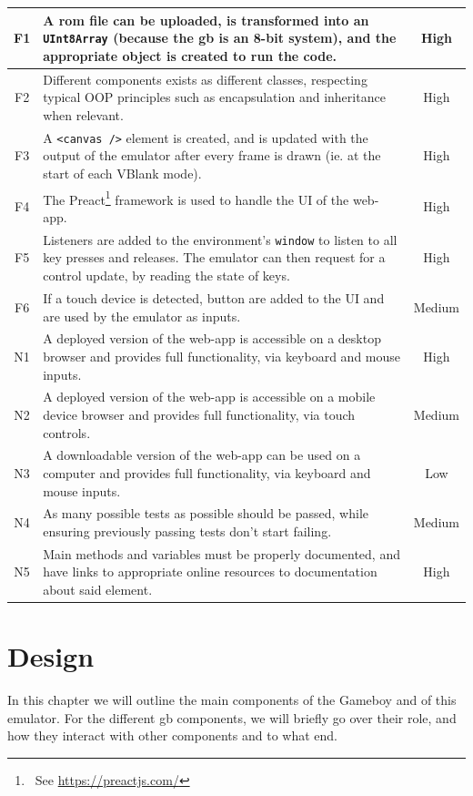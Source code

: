 \documentclass[11pt]{report}
\newcommand{\ftnt}[1]{\footnote{~See \url{#1}}}
\begin{document}
\begin{xltabular}{\textwidth}{|c|X|c|}
    F1 & A \gls{rom} file can be uploaded, is transformed into an \texttt{UInt8Array} (because the \gls{gb} is an 8-bit system), and the appropriate object is created to run the code. & High \\ \hline
    F2 & Different components exists as different classes, respecting typical OOP principles such as encapsulation and inheritance when relevant. & High \\ \hline
    F3 & A \texttt{<canvas />} element is created, and is updated with the output of the emulator after every frame is drawn (ie. at the start of each VBlank mode). & High \\ \hline
    F4 & The Preact\ftnt{https://preactjs.com/} framework is used to handle the UI of the web-app. & High \\ \hline
    F5 & Listeners are added to the environment's \texttt{window} to listen to all key presses and releases. The emulator can then request for a control update, by reading the state of keys. & High \\ \hline
    F6 & If a touch device is detected, button are added to the UI and are used by the emulator as inputs. & Medium \\ \hline

    N1 & A deployed version of the web-app is accessible on a desktop browser and provides full functionality, via keyboard and mouse inputs. & High \\ \hline
    N2 & A deployed version of the web-app is accessible on a mobile device browser and provides full functionality, via touch controls. & Medium \\ \hline
    N3 & A downloadable version of the web-app can be used on a computer and provides full functionality, via keyboard and mouse inputs. & Low \\ \hline
    N4 & As many possible tests as possible should be passed, while ensuring previously passing tests don't start failing. & Medium \\ \hline
    N5 & Main methods and variables must be properly documented, and have links to appropriate online resources to documentation about said element. & High \\ \hline
\end{xltabular}

\chapter{Design}

In this chapter we will outline the main components of the Gameboy and of this emulator. For the different \gls{gb} components, we will briefly go over their role, and how they interact with other components and to what end.
\end{document}
